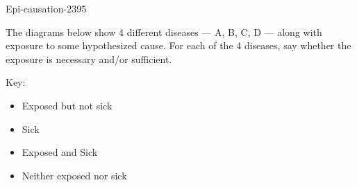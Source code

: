 \begin{AcroScoreProblem}{Epi-causation-2395}

\newcommand{\Person}[1]{
\draw[ultra thick] (#1) circle (.4cm);
}
\newcommand{\Exposed}[1]{
\draw[ultra thick,fill=gray!50] (#1) circle (.4cm);
}
\newcommand{\Sick}[1]{
\draw[ultra thick] (#1) -- +(.25,.25);
\draw[ultra thick] (#1) -- +(.25,-.25);
\draw[ultra thick] (#1) -- +(-.25,-.25);
\draw[ultra thick] (#1) -- +(-.25,.25);
}
\newcommand{\PersonSick}[1]{
\Person{#1}
\Sick{#1}
}
\newcommand{\ExposedSick}[1]{
\Exposed{#1}
\Sick{#1}
}

The diagrams below show 4 different diseases --- A, B, C, D --- along with exposure to
some hypothesized cause.  For each of the 4 diseases, say whether the
exposure is necessary and/or sufficient.

Key:
\begin{itemize}
\item Exposed but not sick 
\item Sick 
\item Exposed and Sick 
\item Neither exposed nor sick 
\end{itemize}



\end{AcroScoreProblem}
